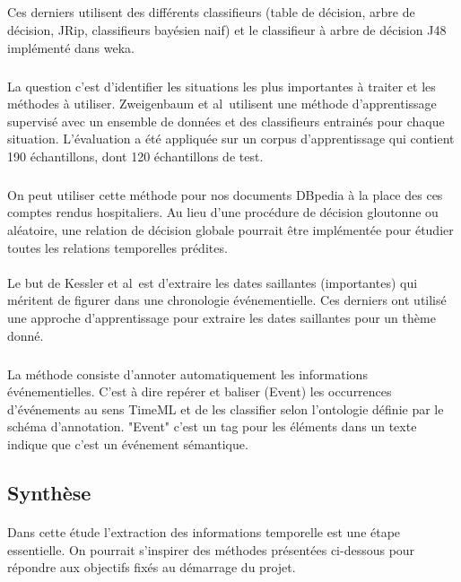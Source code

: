 \subparagraph{}
Ces derniers utilisent des différents classifieurs (table de décision, arbre de décision, JRip, classifieurs bayésien naif) et le classifieur à arbre de décision J48 implémenté dans weka.
\subparagraph{}
La question c’est d’identifier les situations les plus importantes à traiter et les méthodes à utiliser.
Zweigenbaum et al~\cite{zweigenbaum2013}utilisent une méthode d’apprentissage supervisé avec un ensemble de données et des classifieurs entrainés pour chaque situation. 
L'évaluation a été appliquée sur un corpus d’apprentissage qui contient 190 échantillons, dont 120 échantillons de test.
\subparagraph{}
On peut utiliser cette méthode pour nos documents DBpedia à la place des ces comptes rendus hospitaliers.
Au lieu d’une procédure de décision gloutonne ou aléatoire, une relation de décision globale pourrait être implémentée pour étudier toutes les relations temporelles prédites. 
\paragraph{}
Le but de Kessler et al~\cite{kessler2013}est d'extraire les dates saillantes (importantes) qui méritent de figurer dans une chronologie événementielle.
Ces derniers ont utilisé une approche d’apprentissage pour extraire les dates saillantes pour un thème donné.
\subparagraph{}
La méthode consiste d'annoter automatiquement les informations événementielles. 
C’est à dire repérer et baliser (Event) les occurrences d’événements au sens TimeML et de les classifier selon l’ontologie définie par le schéma d’annotation. 
\newline
"Event" c’est un tag pour les éléments dans un texte indique que c’est un événement sémantique.
\subsection*{Synthèse}
\paragraph{}
Dans cette étude l'extraction des informations temporelle est une étape essentielle. On pourrait s'inspirer des méthodes présentées ci-dessous pour répondre aux objectifs fixés au démarrage du projet.

